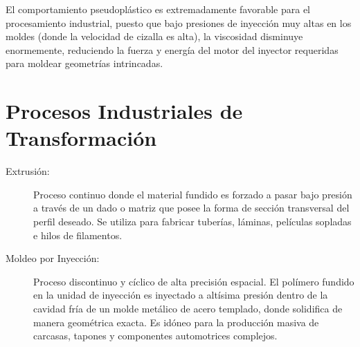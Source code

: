 El comportamiento pseudoplástico es extremadamente favorable para el procesamiento industrial, puesto que bajo presiones de inyección muy altas en los moldes (donde la velocidad de cizalla es alta), la viscosidad disminuye enormemente, reduciendo la fuerza y energía del motor del inyector requeridas para moldear geometrías intrincadas.

\section{Procesos Industriales de Transformación}

\begin{description}
    \item[Extrusión:] Proceso continuo donde el material fundido es forzado a pasar bajo presión a través de un dado o matriz que posee la forma de sección transversal del perfil deseado. Se utiliza para fabricar tuberías, láminas, películas sopladas e hilos de filamentos.
    \item[Moldeo por Inyección:] Proceso discontinuo y cíclico de alta precisión espacial. El polímero fundido en la unidad de inyección es inyectado a altísima presión dentro de la cavidad fría de un molde metálico de acero templado, donde solidifica de manera geométrica exacta. Es idóneo para la producción masiva de carcasas, tapones y componentes automotrices complejos.
\end{description}
